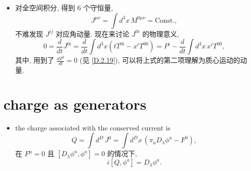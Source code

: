 \begin{itemize}
	\noindent\hdashrule[0.5ex]{\linewidth}{0.5pt}{1mm} %
	
	\item 对全空间积分, 得到 6 个守恒量,
	\begin{equation}
		J^{\mu \nu} = \int d^3 x \, M^{0 \mu \nu} = \text{Const.},
	\end{equation}
	不难发现 $J^{i j}$ 对应角动量. 现在来讨论 $J^{0 i}$ 的物理意义,
	\begin{equation}
		0 = \frac{d}{dt} J^{0 i} = \frac{d}{dt} \int d^3 x (t T^{0 i} - x^i T^{0 0}) = P^i - \frac{d}{dt} \int d^3 x \, x^i T^{0 0},
	\end{equation}
	其中, 用到了 $\frac{d P^i}{dt} = 0$ (见 \eqref{D.2.19}), 可以将上式的第二项理解为质心运动的动量.
\end{itemize}

\section{charge as generators}
\begin{itemize}
	\item the charge associated with the conserved current is
	\begin{equation}
		Q = \int d^D \, J^0 = \int d^D x \, (\pi_a D_\lambda \phi^a - F^0),
	\end{equation}
	在 $F^\mu = 0$ 且 $[D_\lambda \phi^a, \phi^a] = 0$ 的情况下,
	\begin{equation} \label{D.3.2}
		i [Q, \phi^a] = D_\lambda \phi^a.
	\end{equation}
\end{itemize}

